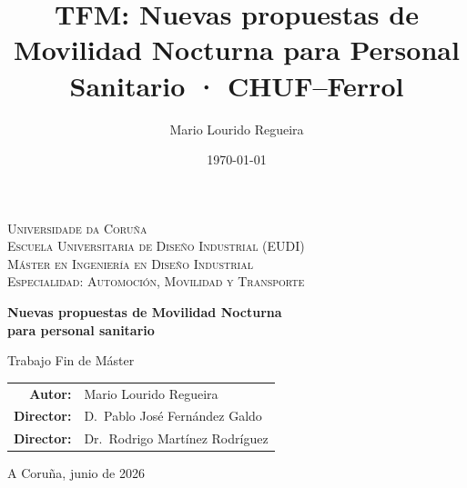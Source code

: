 \documentclass[12pt,a4paper]{article}
\title{TFM: Nuevas propuestas de
Movilidad Nocturna para Personal Sanitario · CHUF--Ferrol}
\author{Mario Lourido Regueira}
\date{\today}
\newenvironment{pendiente}
  {\par\vspace{4pt}\noindent\textcolor{gray}{\textbf{[PENDIENTE]}}\par\begingroup\color{gray}\small}
  {\endgroup\par\vspace{4pt}}
\begin{document}

\begin{titlepage}
\thispagestyle{empty}
\centering

\vspace*{2cm}

{\small\scshape
  Universidade da Coru\~na\\[4pt]
  Escuela Universitaria de Dise\~no Industrial (EUDI)\\[4pt]
  M\'aster en Ingenier\'ia en Dise\~no Industrial\\[4pt]
  Especialidad: Automoci\'on, Movilidad y Transporte
}

\vspace{3cm}

{\LARGE\bfseries
  Nuevas propuestas de Movilidad Nocturna\\[10pt]
   para personal sanitario
}

\vspace{1.5cm}

{\large Trabajo Fin de M\'aster}

\vspace{3cm}

\begin{tabular}{rl}
  \textbf{Autor:}     & Mario Lourido Regueira \\[6pt]
  \textbf{Director:}  & D.~Pablo Jos\'e Fern\'andez Galdo \\[6pt]
  \textbf{Director:}  & Dr.~Rodrigo Mart\'inez Rodr\'iguez \\[6pt]
\end{tabular}

\vfill

{\small A Coru\~na, junio de 2026}

\end{titlepage}




\setcounter{page}{1}

\end{document}
